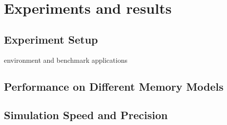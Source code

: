 \section{Experiments and results} \label{sec:result}

\subsection{Experiment Setup}
environment and benchmark applications

\subsection{Performance on Different Memory Models}

\subsection{Simulation Speed and Precision}

